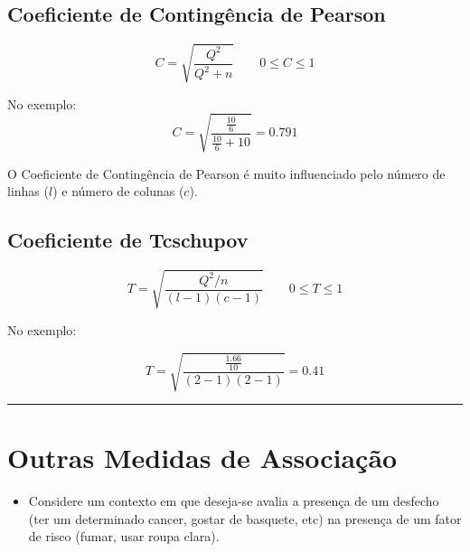 \documentclass[
]{book}
\providecommand{\tightlist}{%
  \setlength{\itemsep}{0pt}\setlength{\parskip}{0pt}}
\begin{document}
\subsection{Coeficiente de Contingência de Pearson}\label{coeficiente-de-continguxeancia-de-pearson}

\[C = \sqrt{\frac{Q^2}{Q^2 + n}} \qquad 0\leq C\leq1\]

No exemplo:\\
\[C = \sqrt{\frac{\frac{10}{6}}{\frac{10}{6} + 10}} = 0.791\]

O Coeficiente de Contingência de Pearson é muito influenciado pelo número de linhas (\(l\)) e número de colunas (\(c\)).

\subsection{Coeficiente de Tcschupov}\label{coeficiente-de-tcschupov}

\[T = \sqrt{\frac{Q^2/n}{(l - 1) (c - 1)}} \qquad 0\leq T\leq1\]

No exemplo:

\[T = \sqrt{\frac{\frac{1.66}{10}}{(2 - 1) (2 - 1)}} = 0.41\]

\begin{center}\rule{0.5\linewidth}{0.5pt}\end{center}

\section{Outras Medidas de Associação}\label{outras-medidas-de-associauxe7uxe3o}

\begin{itemize}
\tightlist
\item
  Considere um contexto em que deseja-se avalia a presença de um desfecho (ter um determinado cancer, gostar de basquete, etc) na presença de um fator de risco (fumar, usar roupa clara).
\end{itemize}
\end{document}
